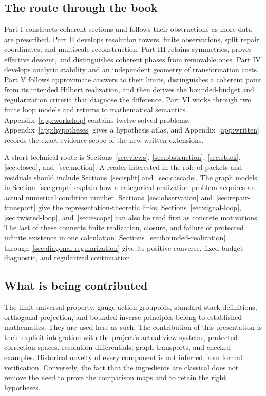\documentclass[11pt]{article}
\begin{document}
\subsection*{The route through the book}
Part I constructs coherent sections and follows their obstructions as more data are prescribed. Part II develops resolution towers, finite observations, split repair coordinates, and multiscale reconstruction. Part III retains symmetries, proves effective descent, and distinguishes coherent phases from removable ones. Part IV develops analytic stability and an independent geometry of transformation costs. Part V follows approximate answers to their limits, distinguishes a coherent point from its intended Hilbert realization, and then derives the bounded-budget and regularization criteria that diagnose the difference. Part VI works through two finite loop models and returns to mathematical semantics. Appendix~\ref{app:workshop} contains twelve solved problems. Appendix~\ref{app:hypotheses} gives a hypothesis atlas, and Appendix~\ref{app:written} records the exact evidence scope of the new written extensions.

A short technical route is Sections~\ref{sec:views}, \ref{sec:obstruction}, \ref{sec:stack}, \ref{sec:closed}, and~\ref{sec:motion}. A reader interested in the role of packets and residuals should include Sections~\ref{sec:split} and~\ref{sec:cascade}. The graph models in Section~\ref{sec:graph} explain how a categorical realization problem acquires an actual numerical condition number. Sections~\ref{sec:observation} and~\ref{sec:repair-transport} give the representation-theoretic links. Sections~\ref{sec:signal-loop}, \ref{sec:twisted-loop}, and~\ref{sec:escape} can also be read first as concrete motivations. The last of these connects finite realization, closure, and failure of protected infinite existence in one calculation. Sections~\ref{sec:bounded-realization} through~\ref{sec:diagonal-regularization} give its positive converse, fixed-budget diagnostic, and regularized continuation.

\subsection*{What is being contributed}
The limit universal property, gauge action groupoids, standard stack definitions, orthogonal projection, and bounded inverse principles belong to established mathematics. They are used here as such. The contribution of this presentation is their explicit integration with the project's actual view systems, protected correction spaces, resolution differentials, graph transports, and checked examples. Historical novelty of every component is not inferred from formal verification. Conversely, the fact that the ingredients are classical does not remove the need to prove the comparison maps and to retain the right hypotheses.
\end{document}
